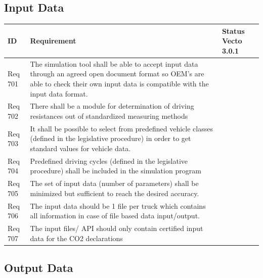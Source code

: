 \subsection{Input Data} %
\label{sub:input_data}

\begin{tabular}{L{\IdColWidth}|L{\ReqColWidth}|M{\StatusColWidth}}
ID & Requirement & Status Vecto 3.0.1 \\ \hline\hline
Req 701 & The simulation tool shall be able to accept input data through an agreed open document format so OEM's are able to check their own input data is compatible with the input data format.  & 
		 \\ \hline
Req 702 & There shall be a module for determination of driving resistances out of standardized measuring methods & 
		 \\ \hline
Req 703 & It shall be possible to select from predefined vehicle classes (defined in the legislative procedure) in order to get standard values for vehicle data.  & 
	\Vcheck	 \\ \hline
Req 704 & Predefined driving cycles (defined in the legislative procedure) shall be included in the simulation program & 
	\Vcheck	 \\ \hline
Req 705 & The set of input data (number of parameters) shall be minimized but sufficient to reach the desired accuracy. & 
		 \\ \hline
Req 706 & The input data should be 1 file per truck which contains all information in case of file based data input/output. & 
		 \\ \hline
Req 707 & The input files/ API should only contain certified input data for the CO2 declarations & 
		 \\ \hline
\end{tabular}

\subsection{Output Data} %
\label{sub:output_data}

